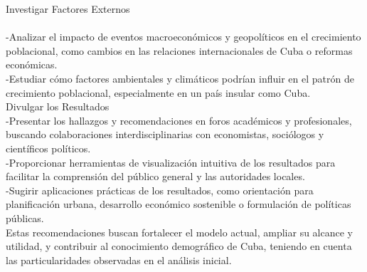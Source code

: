 \documentclass[a4paper,10pt,twocolumn]{article}
\begin{document}
Investigar Factores Externos\\ \\
-Analizar el impacto de eventos macroeconómicos y geopolíticos en el crecimiento poblacional, como cambios en las relaciones internacionales de Cuba o reformas económicas.\\
-Estudiar cómo factores ambientales y climáticos podrían influir en el patrón de crecimiento poblacional, especialmente en un país insular como Cuba.\\
Divulgar los Resultados\\
-Presentar los hallazgos y recomendaciones en foros académicos y profesionales, buscando colaboraciones interdisciplinarias con economistas, sociólogos y científicos políticos.\\
-Proporcionar herramientas de visualización intuitiva de los resultados para facilitar la comprensión del público general y las autoridades locales.\\
-Sugirir aplicaciones prácticas de los resultados, como orientación para planificación urbana, desarrollo económico sostenible o formulación de políticas públicas.\\
Estas recomendaciones buscan fortalecer el modelo actual, ampliar su alcance y utilidad, y contribuir al conocimiento demográfico de Cuba, teniendo en cuenta las particularidades observadas en el análisis inicial.


\end{document}
